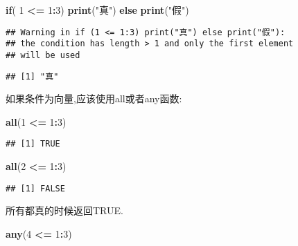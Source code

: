 \documentclass[]{ctexbook}
\newenvironment{Shaded}{\begin{snugshade}}{\end{snugshade}}
\newcommand{\ControlFlowTok}[1]{\textcolor[rgb]{0.13,0.29,0.53}{\textbf{#1}}}
\newcommand{\DecValTok}[1]{\textcolor[rgb]{0.00,0.00,0.81}{#1}}
\newcommand{\KeywordTok}[1]{\textcolor[rgb]{0.13,0.29,0.53}{\textbf{#1}}}
\newcommand{\NormalTok}[1]{#1}
\newcommand{\OperatorTok}[1]{\textcolor[rgb]{0.81,0.36,0.00}{\textbf{#1}}}
\newcommand{\StringTok}[1]{\textcolor[rgb]{0.31,0.60,0.02}{#1}}
\begin{document}
\begin{Shaded}
\begin{Highlighting}[]
\ControlFlowTok{if}\NormalTok{( }\DecValTok{1} \OperatorTok{<=}\StringTok{ }\DecValTok{1}\OperatorTok{:}\DecValTok{3}\NormalTok{) }\KeywordTok{print}\NormalTok{(}\StringTok{"真"}\NormalTok{)  }\ControlFlowTok{else} \KeywordTok{print}\NormalTok{(}\StringTok{"假"}\NormalTok{)}
\end{Highlighting}
\end{Shaded}

\begin{verbatim}
## Warning in if (1 <= 1:3) print("真") else print("假"):
## the condition has length > 1 and only the first element
## will be used
\end{verbatim}

\begin{verbatim}
## [1] "真"
\end{verbatim}

如果条件为向量,应该使用all或者any函数:

\begin{Shaded}
\begin{Highlighting}[]
\KeywordTok{all}\NormalTok{(}\DecValTok{1} \OperatorTok{<=}\StringTok{ }\DecValTok{1}\OperatorTok{:}\DecValTok{3}\NormalTok{)}
\end{Highlighting}
\end{Shaded}

\begin{verbatim}
## [1] TRUE
\end{verbatim}

\begin{Shaded}
\begin{Highlighting}[]
\KeywordTok{all}\NormalTok{(}\DecValTok{2} \OperatorTok{<=}\StringTok{ }\DecValTok{1}\OperatorTok{:}\DecValTok{3}\NormalTok{)}
\end{Highlighting}
\end{Shaded}

\begin{verbatim}
## [1] FALSE
\end{verbatim}

所有都真的时候返回TRUE.

\begin{Shaded}
\begin{Highlighting}[]
\KeywordTok{any}\NormalTok{(}\DecValTok{4} \OperatorTok{<=}\StringTok{ }\DecValTok{1}\OperatorTok{:}\DecValTok{3}\NormalTok{)}
\end{Highlighting}
\end{Shaded}
\end{document}
